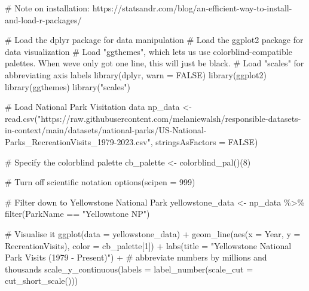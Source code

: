 \documentclass[
  letterpaper,
  DIV=11,
  numbers=noendperiod]{scrartcl}
\newenvironment{Shaded}{\begin{snugshade}}{\end{snugshade}}
\newcommand{\AttributeTok}[1]{\textcolor[rgb]{0.40,0.45,0.13}{#1}}
\newcommand{\CommentTok}[1]{\textcolor[rgb]{0.37,0.37,0.37}{#1}}
\newcommand{\ConstantTok}[1]{\textcolor[rgb]{0.56,0.35,0.01}{#1}}
\newcommand{\DecValTok}[1]{\textcolor[rgb]{0.68,0.00,0.00}{#1}}
\newcommand{\FunctionTok}[1]{\textcolor[rgb]{0.28,0.35,0.67}{#1}}
\newcommand{\NormalTok}[1]{\textcolor[rgb]{0.00,0.23,0.31}{#1}}
\newcommand{\OtherTok}[1]{\textcolor[rgb]{0.00,0.23,0.31}{#1}}
\newcommand{\SpecialCharTok}[1]{\textcolor[rgb]{0.37,0.37,0.37}{#1}}
\newcommand{\StringTok}[1]{\textcolor[rgb]{0.13,0.47,0.30}{#1}}
\begin{document}
\begin{Shaded}
\begin{Highlighting}[]
\CommentTok{\# Note on installation: https://statsandr.com/blog/an{-}efficient{-}way{-}to{-}install{-}and{-}load{-}r{-}packages/}

\CommentTok{\# Load the dplyr package for data manipulation}
\CommentTok{\# Load the ggplot2 package for data visualization}
\CommentTok{\# Load "ggthemes", which let\textquotesingle{}s us use colorblind{-}compatible palettes. When we\textquotesingle{}ve only got one line, this will just be black.}
\CommentTok{\# Load "scales" for abbreviating axis labels}
\FunctionTok{library}\NormalTok{(dplyr, }\AttributeTok{warn =} \ConstantTok{FALSE}\NormalTok{)}
\FunctionTok{library}\NormalTok{(ggplot2)}
\FunctionTok{library}\NormalTok{(ggthemes)}
\FunctionTok{library}\NormalTok{(}\StringTok{"scales"}\NormalTok{)}

\CommentTok{\# Load National Park Visitation data}
\NormalTok{np\_data }\OtherTok{\textless{}{-}} \FunctionTok{read.csv}\NormalTok{(}\StringTok{"https://raw.githubusercontent.com/melaniewalsh/responsible{-}datasets{-}in{-}context/main/datasets/national{-}parks/US{-}National{-}Parks\_RecreationVisits\_1979{-}2023.csv"}\NormalTok{, }\AttributeTok{stringsAsFactors =} \ConstantTok{FALSE}\NormalTok{)}

\CommentTok{\# Specify the colorblind palette}
\NormalTok{cb\_palette }\OtherTok{\textless{}{-}} \FunctionTok{colorblind\_pal}\NormalTok{()(}\DecValTok{8}\NormalTok{)}

\CommentTok{\# Turn off scientific notation}
\FunctionTok{options}\NormalTok{(}\AttributeTok{scipen =} \DecValTok{999}\NormalTok{)}

\CommentTok{\# Filter down to Yellowstone National Park}
\NormalTok{yellowstone\_data }\OtherTok{\textless{}{-}}\NormalTok{ np\_data }\SpecialCharTok{\%\textgreater{}\%} \FunctionTok{filter}\NormalTok{(ParkName }\SpecialCharTok{==} \StringTok{"Yellowstone NP"}\NormalTok{)}

\CommentTok{\# Visualise it}
\FunctionTok{ggplot}\NormalTok{(}\AttributeTok{data =}\NormalTok{ yellowstone\_data) }\SpecialCharTok{+} 
  \FunctionTok{geom\_line}\NormalTok{(}\FunctionTok{aes}\NormalTok{(}\AttributeTok{x =}\NormalTok{ Year, }\AttributeTok{y =}\NormalTok{ RecreationVisits), }\AttributeTok{color =}\NormalTok{ cb\_palette[}\DecValTok{1}\NormalTok{]) }\SpecialCharTok{+} 
  \FunctionTok{labs}\NormalTok{(}\AttributeTok{title =} \StringTok{"Yellowstone National Park Visits (1979 {-} Present)"}\NormalTok{) }\SpecialCharTok{+}
  \CommentTok{\# abbreviate numbers by millions and thousands}
  \FunctionTok{scale\_y\_continuous}\NormalTok{(}\AttributeTok{labels =} \FunctionTok{label\_number}\NormalTok{(}\AttributeTok{scale\_cut =} \FunctionTok{cut\_short\_scale}\NormalTok{()))}
\end{Highlighting}
\end{Shaded}
\end{document}
